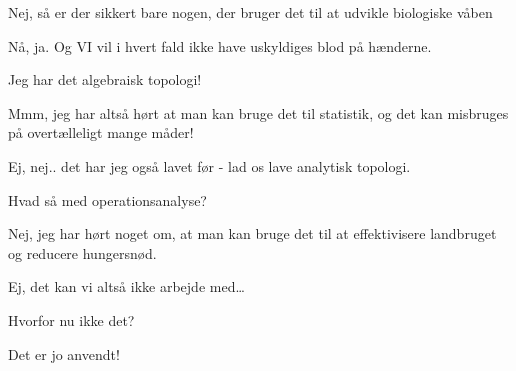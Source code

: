 \documentclass[a4paper,11pt]{article}
\begin{document}
\begin{sketch}
 Nej, så er der sikkert bare nogen, der bruger det til at udvikle biologiske våben

 Nå, ja. Og VI vil i hvert fald ikke have uskyldiges blod på hænderne. 

 Jeg har det algebraisk topologi! 

 Mmm, jeg har altså hørt at man kan bruge det til statistik, og det kan misbruges på overtælleligt mange måder!

 Ej, nej.. det har jeg også lavet før - lad os lave analytisk topologi. 

  Hvad så med operationsanalyse?

 Nej, jeg har hørt noget om, at man kan bruge det til at effektivisere landbruget og reducere hungersnød.

 Ej, det kan vi altså ikke arbejde med…

 Hvorfor nu ikke det? 

 Det er jo anvendt!




\end{sketch}
\end{document}

